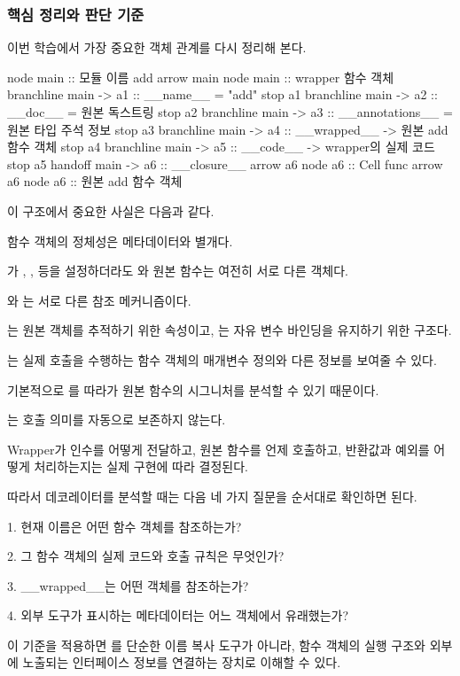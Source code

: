 \subsubsection{핵심 정리와 판단 기준}

이번 학습에서 가장 중요한 객체 관계를 다시 정리해 본다.

\begin{dhkbranch}[in=8]
node main :: 모듈 이름 add
arrow main
node main :: wrapper 함수 객체
branchline main -> a1 :: __name__ = "add"
stop a1
branchline main -> a2 :: __doc__ = 원본 독스트링
stop a2
branchline main -> a3 :: __annotations__ = 원본 타입 주석 정보
stop a3
branchline main -> a4 :: __wrapped__ -> 원본 add 함수 객체
stop a4
branchline main -> a5 :: __code__ -> wrapper의 실제 코드
stop a5
handoff main -> a6 :: __closure__
arrow a6
node a6 :: Cell func
arrow a6
node a6 :: 원본 add 함수 객체
\end{dhkbranch}

이 구조에서 중요한 사실은 다음과 같다.

함수 객체의 정체성은 메타데이터와 별개다.

가 , ,  등을 설정하더라도 와 원본 함수는 여전히 서로 다른 객체다.

와 는 서로 다른 참조 메커니즘이다.

는 원본 객체를 추적하기 위한 속성이고, 는 자유 변수 바인딩을 유지하기 위한 구조다.

는 실제 호출을 수행하는 함수 객체의 매개변수 정의와 다른 정보를 보여줄 수 있다.

기본적으로 를 따라가 원본 함수의 시그니처를 분석할 수 있기 때문이다.

는 호출 의미를 자동으로 보존하지 않는다.

Wrapper가 인수를 어떻게 전달하고, 원본 함수를 언제 호출하고, 반환값과 예외를 어떻게 처리하는지는 실제 구현에 따라 결정된다.

따라서 데코레이터를 분석할 때는 다음 네 가지 질문을 순서대로 확인하면 된다.

\begin{dhksmry}
1. 현재 이름은 어떤 함수 객체를 참조하는가?

2. 그 함수 객체의 실제 코드와 호출 규칙은 무엇인가?

3. __wrapped__는 어떤 객체를 참조하는가?

4. 외부 도구가 표시하는 메타데이터는 어느 객체에서 유래했는가?
\end{dhksmry}

이 기준을 적용하면 를 단순한 이름 복사 도구가 아니라, 함수 객체의 실행 구조와 외부에 노출되는 인터페이스 정보를 연결하는 장치로 이해할 수 있다.
